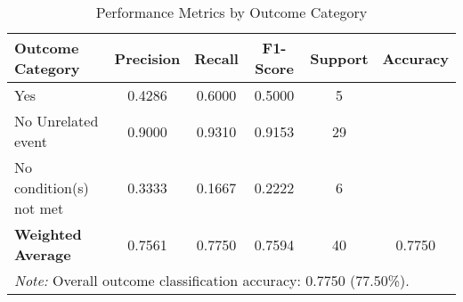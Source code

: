 \begin{table}[H]
\centering
\caption{Performance Metrics by Outcome Category}
\label{tab:classification_metrics}
\begin{tabular}{lccccc}
\toprule
\textbf{Outcome Category} & \textbf{Precision} & \textbf{Recall} & \textbf{F1-Score} & \textbf{Support} & \textbf{Accuracy} \\
\midrule
Yes & 0.4286 & 0.6000 & 0.5000 & 5 & \multirow{1}{*}{} \\
No \- Unrelated event & 0.9000 & 0.9310 & 0.9153 & 29 & \multirow{1}{*}{} \\
No \- condition(s) not met & 0.3333 & 0.1667 & 0.2222 & 6 & \multirow{1}{*}{} \\
\midrule
\textbf{Weighted Average} & 0.7561 & 0.7750 & 0.7594 & 40 & 0.7750 \\
\bottomrule
\multicolumn{6}{p{14cm}}{\textit{Note:} Overall outcome classification accuracy: 0.7750 (77.50\%).} \\
\end{tabular}
\end{table}
